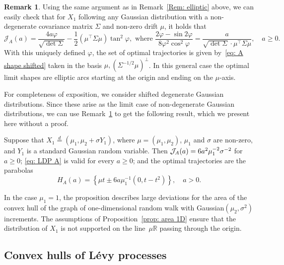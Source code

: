 \documentclass[10pt]{amsart}
\theoremstyle{definition}\newtheorem{defi}[theo]{Definition}\newtheorem{rema}[theo]{Remark}\newtheorem{exam}[theo]{Example}\newtheorem{exem}[theo]{Example}\newtheorem{nota}[theo]{Notation}
\newcommand{\Rbb}{\mathbb{R}}
\newcommand{\Jcl}{\mathcal{J}}
\begin{document}
\begin{rema}\label{Rem: elliptic arcs}
Using the same argument as in Remark~\ref{Rem: elliptic} above, we can easily check that for $X_1$ following any Gaussian distribution with a non-degenerate covariance matrix $\Sigma$ and non-zero drift $\mu$, it holds that
\[
\Jcl_A(a)=\frac{4a \varphi}{\sqrt{\det \Sigma}} - \frac12 \left(\mu^\top \Sigma \mu\right) \tan^2 \varphi, \text{ where } \frac{2\varphi - \sin 2 \varphi}{8 \varphi^2 \cos^2 \varphi} = \frac{a}{\sqrt{\det \Sigma} \cdot \mu^\top \Sigma \mu}, \quad a \ge 0.
\]
With this uniquely defined $\varphi$, the set of optimal trajectories is given by~\eqref{eq: A shape shifted} taken in the basis $\mu, (\Sigma^{-1/2} \mu)^\bot$. In this general case the optimal limit shapes are elliptic arcs starting at the origin and ending on the $\mu$-axis.
\end{rema}

For completeness of exposition, we consider shifted degenerate Gaussian distributions. Since these arise as the limit case of non-degenerate Gaussian distributions, we can use Remark~\ref{Rem: elliptic arcs} to get the following result, which we present here without a proof.

\begin{prop}\label{prop: area 1D}
Suppose that $X_1 \stackrel{d}{=}(\mu_1, \mu_2 + \sigma Y_1)$, where $\mu=(\mu_1, \mu_2)$, $\mu_1$ and $\sigma$ are non-zero, and $Y_1$ is a standard Gaussian random variable. Then $\Jcl_A(a)\linebreak= 6 a^2 \mu_1^{-2} \sigma^{-2}$ for $a \ge 0$; \eqref{eq: LDP A} is valid for every $a \ge 0$; and the optimal trajectories are the parabolas
\begin{equation*}
H_A(a)= \left\{\mu t \pm 6a \mu_1^{-1}\left(0, t- t^2\right) \right\}, \quad a > 0.
\end{equation*}
\end{prop}

In the case $\mu_1=1$, the proposition describes large deviations for the area of the convex hull of the graph of one-dimensional random walk with Gaussian$(\mu_2, \sigma^2)$ increments. The assumptions of Proposition~\ref{prop: area 1D} ensure that the distribution of $X_1$ is not supported on the line~$\mu \Rbb$ passing through the origin.



\subsection{Convex hulls of L\'evy processes} \label{sec: continuous time}
\end{document}

